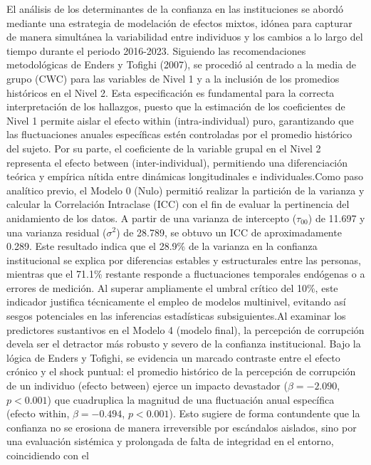 \documentclass[
  spanish,
  a4paper,
  oneside]{scrbook}
\begin{document}
El análisis de los determinantes de la confianza en las instituciones se
abordó mediante una estrategia de modelación de efectos mixtos, idónea
para capturar de manera simultánea la variabilidad entre individuos y
los cambios a lo largo del tiempo durante el periodo 2016-2023.
Siguiendo las recomendaciones metodológicas de Enders y Tofighi (2007),
se procedió al centrado a la media de grupo (CWC) para las variables de
Nivel 1 y a la inclusión de los promedios históricos en el Nivel 2. Esta
especificación es fundamental para la correcta interpretación de los
hallazgos, puesto que la estimación de los coeficientes de Nivel 1
permite aislar el efecto within (intra-individual) puro, garantizando
que las fluctuaciones anuales específicas estén controladas por el
promedio histórico del sujeto. Por su parte, el coeficiente de la
variable grupal en el Nivel 2 representa el efecto between
(inter-individual), permitiendo una diferenciación teórica y empírica
nítida entre dinámicas longitudinales e individuales.Como paso analítico
previo, el Modelo 0 (Nulo) permitió realizar la partición de la varianza
y calcular la Correlación Intraclase (ICC) con el fin de evaluar la
pertinencia del anidamiento de los datos. A partir de una varianza de
intercepto (\(\tau_{00}\)) de 11.697 y una varianza residual
(\(\sigma^2\)) de 28.789, se obtuvo un ICC de aproximadamente 0.289.
Este resultado indica que el 28.9\% de la varianza en la confianza
institucional se explica por diferencias estables y estructurales entre
las personas, mientras que el 71.1\% restante responde a fluctuaciones
temporales endógenas o a errores de medición. Al superar ampliamente el
umbral crítico del 10\%, este indicador justifica técnicamente el empleo
de modelos multinivel, evitando así sesgos potenciales en las
inferencias estadísticas subsiguientes.Al examinar los predictores
sustantivos en el Modelo 4 (modelo final), la percepción de corrupción
devela ser el detractor más robusto y severo de la confianza
institucional. Bajo la lógica de Enders y Tofighi, se evidencia un
marcado contraste entre el efecto crónico y el shock puntual: el
promedio histórico de la percepción de corrupción de un individuo
(efecto between) ejerce un impacto devastador (\(\beta = -2.090\),
\(p < 0.001\)) que cuadruplica la magnitud de una fluctuación anual
específica (efecto within, \(\beta = -0.494\), \(p < 0.001\)). Esto
sugiere de forma contundente que la confianza no se erosiona de manera
irreversible por escándalos aislados, sino por una evaluación sistémica
y prolongada de falta de integridad en el entorno, coincidiendo con el
\end{document}
